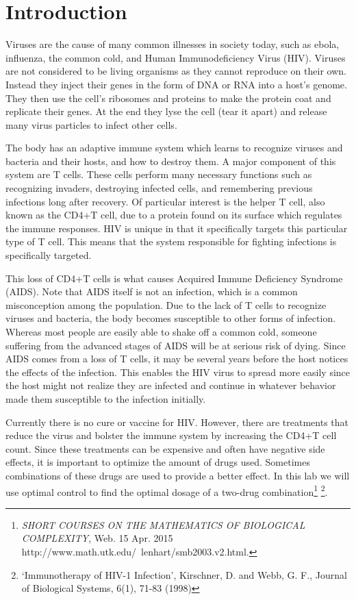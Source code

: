 \label{lab:hiv}


\section*{Introduction}
    Viruses are the cause of many common illnesses in society today, such as ebola, influenza, the common cold, and Human Immunodeficiency Virus (HIV). Viruses are not considered to be living organisms as they cannot reproduce on their own. Instead they inject their genes in the form of DNA or RNA into a host's genome. They then use the cell's ribosomes and proteins to make the protein coat and replicate their genes. At the end they lyse the cell (tear it apart) and release many virus particles to infect other cells.\par
    The body has an adaptive immune system which learns to recognize viruses and bacteria and their hosts, and how to destroy them. A major component of this system are T cells. These cells perform many necessary functions such as recognizing invaders, destroying infected cells, and remembering previous infections long after recovery. Of particular interest is the helper T cell, also known as the CD4+T cell, due to a protein found on its surface which regulates the immune responses. HIV is unique in that it specifically targets this particular type of T cell. This means that the system responsible for fighting infections is specifically targeted.\par
    This loss of CD4+T cells is what causes Acquired Immune Deficiency Syndrome (AIDS). Note that AIDS itself is not an infection, which is a common misconception among the population. Due to the lack of T cells to recognize viruses and bacteria, the body becomes susceptible to other forms of infection. Whereas most people are easily able to shake off a common cold, someone suffering from the advanced stages of AIDS will be at serious risk of dying. Since AIDS comes from a loss of T cells, it may be several years before the host notices the effects of the infection. This enables the HIV virus to spread more easily since the host might not realize they are infected and continue in whatever behavior made them susceptible to the infection initially.\par
   Currently there is no cure or vaccine for HIV. However, there are treatments that reduce the virus and bolster the immune system by increasing the CD4+T cell count. Since these treatments can be expensive and often have negative side effects, it is important to optimize the amount of drugs used. Sometimes combinations of these drugs are used to provide a better effect. In this lab we will use optimal control to find the optimal dosage of a two-drug combination\footnote{\textit{SHORT COURSES ON THE MATHEMATICS OF BIOLOGICAL COMPLEXITY}, Web. 15 Apr. 2015 http://www.math.utk.edu/~lenhart/smb2003.v2.html.} \footnote{`Immunotherapy of HIV-1 Infection', Kirschner, D. and Webb, G. F., Journal of Biological Systems, 6(1), 71-83 (1998)}.
   
